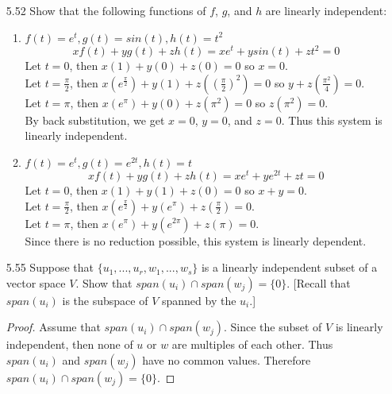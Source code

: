 \documentclass[12pt]{article}
\begin{document}
\begin{enumerate}
\item[5.52] Show that the following functions of $f$, $g$, and $h$ are linearly independent:
	\begin{enumerate}
	\item $f(t)=e^t,g(t)=sin(t),h(t)=t^2$
		\[ xf(t)+yg(t)+zh(t) = xe^t+ysin(t)+zt^2 = 0 \]
		Let $t=0$, then $x(1)+y(0)+z(0) = 0$ so $x=0$.\\
		Let $t=\frac{\pi}{2}$, then $x(e^{\frac{\pi}{2}})+y(1)+z((\frac{\pi}{2})^2)=0$ so $y+z(\frac{\pi^2}{4})=0$.\\
		Let $t=\pi$, then $x(e^{\pi})+y(0)+z(\pi^2)=0$ so $z(\pi^2)=0$.\\
		By back substitution, we get $x=0$, $y=0$, and $z=0$. Thus this system is linearly independent.
	\item $f(t)=e^t,g(t)=e^{2t},h(t)=t$
	\[ xf(t)+yg(t)+zh(t) = xe^t+ye^{2t}+zt = 0 \]
	Let $t=0$, then $x(1)+y(1)+z(0) = 0$ so $x+y=0$.\\
	Let $t=\frac{\pi}{2}$, then $x(e^{\frac{\pi}{2}})+y(e^{\pi})+z(\frac{\pi}{2}) = 0$.\\
	Let $t=\pi$, then $x(e^\pi)+y(e^{2\pi})+z(\pi)=0$.\\
	Since there is no reduction possible, this system is linearly dependent.
	\end{enumerate}
\item[5.55] Suppose that $\{u_1,...,u_r,w_1,...,w_s\}$ is a linearly independent subset of a vector space $V$. Show that $span(u_i) \cap span(w_j)=\{0\}$. [Recall that $span(u_i)$ is the subspace of $V$ spanned by the $u_i$.]
	\begin{proof}
	Assume that $span(u_i)\cap span(w_j)$. Since the subset of $V$ is linearly independent, then none of $u$ or $w$ are multiples of each other. Thus $span(u_i)$ and $span(w_j)$ have no common values. Therefore $span(u_i)\cap span(w_j) = \{0\}$.
	\end{proof}
	

\end{enumerate}
\end{document}

